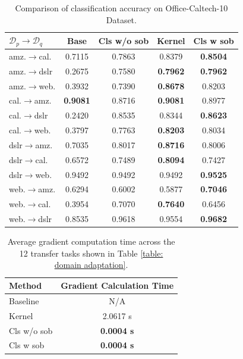 \documentclass[11pt]{article}
\newcommand{\cD}{\mathcal{D}}
\theoremstyle{plain}
\theoremstyle{definition}
\theoremstyle{remark}
\begin{document}
\begin{table}[htbp]
    \centering\small
    \caption{Comparison of classification accuracy on Office-Caltech-10 Dataset.}\label{table: domain adaptation}
    \label{tab:results}
    \begin{tabular}{lcccc}
        \toprule
        \textbf{$\cD_p\rightarrow\cD_q$} & \textbf{Base} & \textbf{Cls w/o sob} & \textbf{Kernel} & \textbf{Cls w sob} \\
        \midrule
        amz.$\to$cal. & 0.7115 & 0.7863 & 0.8379 & \textbf{0.8504} \\
        amz.$\to$dslr    & 0.2675 & 0.7580 & \textbf{0.7962} & \textbf{0.7962} \\
        amz.$\to$web.  & 0.3932 & 0.7390 & \textbf{0.8678} & 0.8203 \\
        cal.$\to$amz. & \textbf{0.9081} & 0.8716 & \textbf{0.9081} & 0.8977 \\
        cal.$\to$dslr   & 0.2420 & 0.8535 & 0.8344 & \textbf{0.8623} \\
        cal.$\to$web. & 0.3797 & 0.7763 & \textbf{0.8203} & 0.8034 \\
        dslr$\to$amz.    & 0.7035 & 0.8017 & \textbf{0.8716} & 0.8006 \\
        dslr$\to$cal.   & 0.6572 & 0.7489 & \textbf{0.8094} & 0.7427 \\
        dslr$\to$web.    & 0.9492 & 0.9492 & 0.9492 & \textbf{0.9525} \\
        web.$\to$amz.  & 0.6294 & 0.6002 & 0.5877 & \textbf{0.7046} \\
        web.$\to$cal. & 0.3954 & 0.7070 & \textbf{0.7640} & 0.6456 \\
        web.$\to$dslr    & 0.8535 & 0.9618 & 0.9554 & \textbf{0.9682} \\
        \bottomrule
    \end{tabular}
\end{table}
\begin{table}[htbp]
    \centering\small
    \caption{Average gradient computation time across the 12 transfer tasks shown in Table \ref{table: domain adaptation}.}\label{tab: gradient cal time}
    \label{tab:gradient_times}
    \begin{tabular}{lc}
        \toprule
        \textbf{Method} & \textbf{Gradient Calculation Time} \\
        \midrule
        Baseline & N/A \\
        Kernel & 2.0617 s \\
        Cls w/o sob & \textbf{0.0004 s} \\
        Cls w sob  & \textbf{0.0004 s} \\
        \bottomrule
    \end{tabular}
\end{table}
\end{document}
